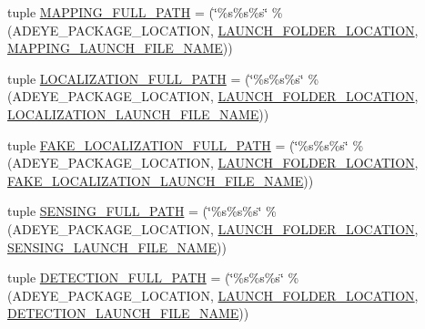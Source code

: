 \begin{DoxyCompactItemize}
\item 
tuple \hyperlink{namespacemanager_aa62d8709423fedec1c58eb802a65cd4d}{M\+A\+P\+P\+I\+N\+G\+\_\+\+F\+U\+L\+L\+\_\+\+P\+A\+TH} = (\char`\"{}\%s\%s\%s\char`\"{} \% (A\+D\+E\+Y\+E\+\_\+\+P\+A\+C\+K\+A\+G\+E\+\_\+\+L\+O\+C\+A\+T\+I\+ON, \hyperlink{namespacemanager_aade405cb0881d91b45085d7bc0f392fa}{L\+A\+U\+N\+C\+H\+\_\+\+F\+O\+L\+D\+E\+R\+\_\+\+L\+O\+C\+A\+T\+I\+ON}, \hyperlink{namespacemanager_ad33e0681d727d6ce2212b3b1e8df8c58}{M\+A\+P\+P\+I\+N\+G\+\_\+\+L\+A\+U\+N\+C\+H\+\_\+\+F\+I\+L\+E\+\_\+\+N\+A\+ME}))
\item 
tuple \hyperlink{namespacemanager_a066d10c0cbeebfc5036425b22d06aa6a}{L\+O\+C\+A\+L\+I\+Z\+A\+T\+I\+O\+N\+\_\+\+F\+U\+L\+L\+\_\+\+P\+A\+TH} = (\char`\"{}\%s\%s\%s\char`\"{} \% (A\+D\+E\+Y\+E\+\_\+\+P\+A\+C\+K\+A\+G\+E\+\_\+\+L\+O\+C\+A\+T\+I\+ON, \hyperlink{namespacemanager_aade405cb0881d91b45085d7bc0f392fa}{L\+A\+U\+N\+C\+H\+\_\+\+F\+O\+L\+D\+E\+R\+\_\+\+L\+O\+C\+A\+T\+I\+ON}, \hyperlink{namespacemanager_ac5cea2f52fdf5b97671e86476298f965}{L\+O\+C\+A\+L\+I\+Z\+A\+T\+I\+O\+N\+\_\+\+L\+A\+U\+N\+C\+H\+\_\+\+F\+I\+L\+E\+\_\+\+N\+A\+ME}))
\item 
tuple \hyperlink{namespacemanager_a3f4276e287ba46746f54f0caa40e408d}{F\+A\+K\+E\+\_\+\+L\+O\+C\+A\+L\+I\+Z\+A\+T\+I\+O\+N\+\_\+\+F\+U\+L\+L\+\_\+\+P\+A\+TH} = (\char`\"{}\%s\%s\%s\char`\"{} \% (A\+D\+E\+Y\+E\+\_\+\+P\+A\+C\+K\+A\+G\+E\+\_\+\+L\+O\+C\+A\+T\+I\+ON, \hyperlink{namespacemanager_aade405cb0881d91b45085d7bc0f392fa}{L\+A\+U\+N\+C\+H\+\_\+\+F\+O\+L\+D\+E\+R\+\_\+\+L\+O\+C\+A\+T\+I\+ON}, \hyperlink{namespacemanager_a4d3eb6177218a24979c6889f9c1908d2}{F\+A\+K\+E\+\_\+\+L\+O\+C\+A\+L\+I\+Z\+A\+T\+I\+O\+N\+\_\+\+L\+A\+U\+N\+C\+H\+\_\+\+F\+I\+L\+E\+\_\+\+N\+A\+ME}))
\item 
tuple \hyperlink{namespacemanager_aeedd72a434a67d10fd373ddd152ae332}{S\+E\+N\+S\+I\+N\+G\+\_\+\+F\+U\+L\+L\+\_\+\+P\+A\+TH} = (\char`\"{}\%s\%s\%s\char`\"{} \% (A\+D\+E\+Y\+E\+\_\+\+P\+A\+C\+K\+A\+G\+E\+\_\+\+L\+O\+C\+A\+T\+I\+ON, \hyperlink{namespacemanager_aade405cb0881d91b45085d7bc0f392fa}{L\+A\+U\+N\+C\+H\+\_\+\+F\+O\+L\+D\+E\+R\+\_\+\+L\+O\+C\+A\+T\+I\+ON}, \hyperlink{namespacemanager_a368d806bbf5be8e72604353b971871d5}{S\+E\+N\+S\+I\+N\+G\+\_\+\+L\+A\+U\+N\+C\+H\+\_\+\+F\+I\+L\+E\+\_\+\+N\+A\+ME}))
\item 
tuple \hyperlink{namespacemanager_a6c770a978c4d514742b18d200aa5e09e}{D\+E\+T\+E\+C\+T\+I\+O\+N\+\_\+\+F\+U\+L\+L\+\_\+\+P\+A\+TH} = (\char`\"{}\%s\%s\%s\char`\"{} \% (A\+D\+E\+Y\+E\+\_\+\+P\+A\+C\+K\+A\+G\+E\+\_\+\+L\+O\+C\+A\+T\+I\+ON, \hyperlink{namespacemanager_aade405cb0881d91b45085d7bc0f392fa}{L\+A\+U\+N\+C\+H\+\_\+\+F\+O\+L\+D\+E\+R\+\_\+\+L\+O\+C\+A\+T\+I\+ON}, \hyperlink{namespacemanager_a1312c3fc2b915604378de82f841606b3}{D\+E\+T\+E\+C\+T\+I\+O\+N\+\_\+\+L\+A\+U\+N\+C\+H\+\_\+\+F\+I\+L\+E\+\_\+\+N\+A\+ME}))

\end{DoxyCompactItemize}

